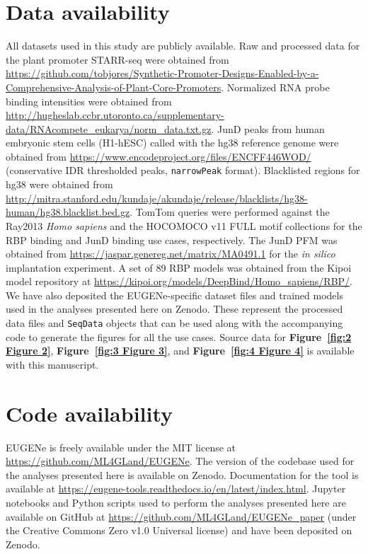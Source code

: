\section{Data availability}

All datasets used in this study are publicly available. Raw and processed data for the plant promoter STARR-seq were obtained from \url{https://github.com/tobjores/Synthetic-Promoter-Designs-Enabled-by-a-Comprehensive-Analysis-of-Plant-Core-Promoters}. Normalized RNA probe binding intensities were obtained from \url{http://hugheslab.ccbr.utoronto.ca/supplementary-data/RNAcompete_eukarya/norm_data.txt.gz}. JunD peaks from human embryonic stem cells (H1-hESC) called with the hg38 reference genome were obtained from \url{https://www.encodeproject.org/files/ENCFF446WOD/} (conservative IDR thresholded peaks, \texttt{narrowPeak} format). Blacklisted regions for hg38 were obtained from \url{http://mitra.stanford.edu/kundaje/akundaje/release/blacklists/hg38-human/hg38.blacklist.bed.gz}. TomTom queries were performed against the Ray2013 \textit{Homo sapiens} and the HOCOMOCO v11 FULL motif collections for the RBP binding and JunD binding use cases, respectively. The JunD PFM was obtained from \url{https://jaspar.genereg.net/matrix/MA0491.1} for the \textit{in silico} implantation experiment. A set of 89 RBP models was obtained from the Kipoi model repository at \url{https://kipoi.org/models/DeepBind/Homo_sapiens/RBP/}. We have also deposited the EUGENe-specific dataset files and trained models used in the analyses presented here on Zenodo\cite{Klie2023-vf}. These represent the processed data files and \texttt{SeqData} objects that can be used along with the accompanying code to generate the figures for all the use cases. Source data for \textbf{Figure~\ref{fig:2 Figure 2}}, \textbf{Figure~\ref{fig:3 Figure 3}}, and \textbf{Figure~\ref{fig:4 Figure 4}} is available with this manuscript.

\section{Code availability}

EUGENe is freely available under the MIT license at \url{https://github.com/ML4GLand/EUGENe}. The version of the codebase used for the analyses presented here is available on Zenodo\cite{Klie2023-gx}. Documentation for the tool is available at \url{https://eugene-tools.readthedocs.io/en/latest/index.html}. Jupyter notebooks and Python scripts used to perform the analyses presented here are available on GitHub at \url{https://github.com/ML4GLand/EUGENe_paper} (under the Creative Commons Zero v1.0 Universal license) and have been deposited on Zenodo\cite{Klie2023-ku}.

